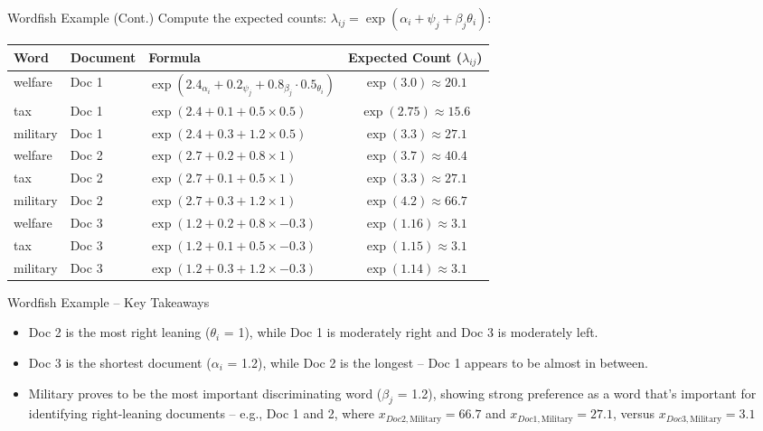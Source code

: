 \documentclass[
  ignorenonframetext,
  aspectratio=169]{beamer}
\begin{document}
\begin{frame}{Wordfish Example (Cont.)}
\label{wordfish-example-cont.-2}
Compute the expected counts:
\(\lambda_{ij} = \exp(\alpha_i + \psi_j + \beta_j\theta_i)\):

\par \vspace{2.5mm}

\begin{tabular}{lllc}
\toprule
Word & Document & Formula & Expected Count ($\lambda_{ij}$) \\
\midrule
welfare  & Doc 1 & $\exp(2.4_{\alpha_i} + 0.2_{\psi_j} + 0.8_{\beta_j}\cdot 0.5_{\theta_i})$ & $\exp(3.0) \approx 20.1$ \\
tax      & Doc 1 & $\exp(2.4 + 0.1 + 0.5 \times 0.5)$ & $\exp(2.75) \approx 15.6$ \\
military & Doc 1 & $\exp(2.4 + 0.3 + 1.2 \times 0.5)$ & $\exp(3.3) \approx 27.1$ \\
\addlinespace
welfare  & Doc 2 & $\exp(2.7 + 0.2 + 0.8 \times 1)$ & $\exp(3.7) \approx 40.4$ \\
tax      & Doc 2 & $\exp(2.7 + 0.1 + 0.5 \times 1)$ & $\exp(3.3) \approx 27.1$ \\
military & Doc 2 & $\exp(2.7 + 0.3 + 1.2 \times 1)$ & $\exp(4.2) \approx 66.7$ \\
\addlinespace
welfare  & Doc 3 & $\exp(1.2 + 0.2 + 0.8 \times -0.3)$ & $\exp(1.16) \approx 3.1$ \\
tax      & Doc 3 & $\exp(1.2 + 0.1 + 0.5 \times -0.3)$ & $\exp(1.15) \approx 3.1$ \\
military & Doc 3 & $\exp(1.2 + 0.3 + 1.2 \times -0.3)$ & $\exp(1.14) \approx 3.1$ \\
\bottomrule
\end{tabular}
\end{frame}

\begin{frame}{Wordfish Example -- Key Takeaways}
\label{wordfish-example-key-takeaways}
\begin{itemize}
  \item Doc 2 is the most right leaning ($\theta_i$ = 1), while Doc 1 is moderately right and Doc 3 is moderately left. \par \vspace{2.5mm}
  \item Doc 3 is the shortest document ($\alpha_i$ = 1.2), while Doc 2 is the longest -- Doc 1 appears to be almost in between.  \par \vspace{2.5mm}
  \item Military proves to be the most important discriminating word ($\beta_j$ = 1.2), showing strong preference as a word that's important for identifying right-leaning documents -- e.g., Doc 1 and 2, where $x_{Doc2,\text{Military}} = 66.7$ and $x_{Doc1,\text{Military}} = 27.1$, versus $x_{Doc3,\text{Military}} = 3.1$
\end{itemize}
\end{frame}
\end{document}
